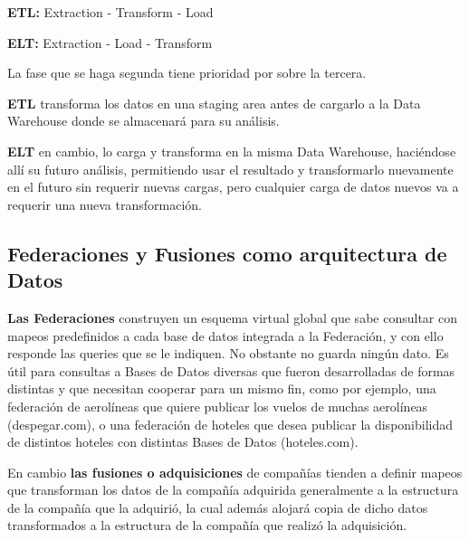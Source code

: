 \textbf{ETL:} Extraction - Transform - Load

\textbf{ELT:} Extraction - Load - Transform

La fase que se haga  segunda tiene prioridad por sobre la tercera. 

\textbf{ETL} transforma los datos en una staging area antes de cargarlo a la Data Warehouse donde se  almacenará para su análisis.

\textbf{ELT} en cambio, lo carga y transforma en la misma Data Warehouse, haciéndose allí su futuro análisis, permitiendo usar el resultado y transformarlo nuevamente en el futuro sin requerir nuevas cargas, pero cualquier carga de datos nuevos va a requerir una nueva transformación.

\subsection*{Federaciones y Fusiones como arquitectura de Datos}

\textbf{Las Federaciones} construyen un esquema virtual global que sabe consultar con mapeos predefinidos a cada base de datos integrada a la Federación, y con ello responde las queries que se le indiquen. No obstante no guarda ningún dato. Es útil para consultas a Bases de Datos diversas que fueron desarrolladas de formas distintas y que necesitan cooperar para un mismo fin, como por ejemplo, una federación de aerolíneas que quiere publicar los vuelos de muchas aerolíneas (despegar.com), o una federación de hoteles que desea publicar la disponibilidad de distintos hoteles con distintas Bases de Datos (hoteles.com).

En cambio \textbf{las fusiones o adquisiciones} de compañías tienden a definir mapeos que transforman los datos de la compañía adquirida generalmente a la estructura de la compañía que la adquirió, la cual además alojará copia de dicho datos transformados a la  estructura de la compañía que realizó la adquisición.